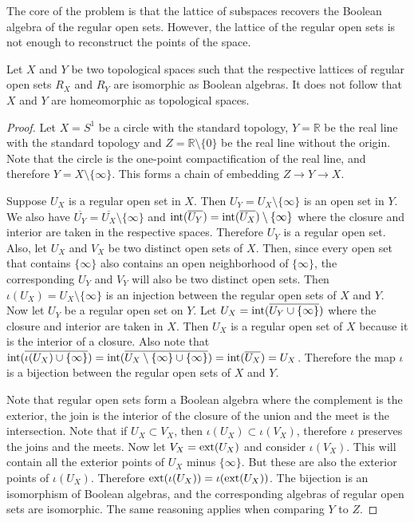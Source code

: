 The core of the problem is that the lattice of subspaces recovers the Boolean algebra of the regular open sets. However, the lattice of the regular open sets is not enough to reconstruct the points of the space.

\begin{prop}\label{pm-es-regularOpenSetsNotEnough}
	Let $X$ and $Y$ be two topological spaces such that the respective lattices of regular open sets $R_X$ and $R_Y$ are isomorphic as Boolean algebras. It does not follow that $X$ and $Y$ are homeomorphic as topological spaces.
\end{prop}

\begin{proof}
	Let $X=S^1$ be a circle with the standard topology, $Y=\mathbb{R}$ be the real line with the standard topology and $Z=\mathbb{R}\setminus \{0\}$ be the real line without the origin. Note that the circle is the one-point compactification of the real line, and therefore $Y=X\setminus \{\infty\}$. This forms a chain of embedding $Z \to Y \to X$.
	
	Suppose $U_X$ is a regular open set in $X$. Then $U_Y = U_X \setminus \{\infty\}$ is an open set in $Y$. We also have $\overline{U_Y} = \overline{U_X} \setminus \{\infty\}$ and $\operatorname{int}(\overline{U_Y}) = \operatorname{int}(\overline{U_X}) \setminus \{\infty\}$ where the closure and interior are taken in the respective spaces. Therefore $U_Y$ is a regular open set. Also, let $U_X$ and $V_X$ be two distinct open sets of $X$. Then, since every open set that contains $\{\infty\}$ also contains an open neighborhood of $\{\infty\}$, the corresponding $U_Y$ and $V_Y$ will also be two distinct open sets. Then $\iota(U_X) = U_X \setminus \{\infty\}$ is an injection between the regular open sets of $X$ and $Y$. Now let $U_Y$ be a regular open set on $Y$. Let $U_X = \operatorname{int}(\overline{U_Y \cup \{ \infty \}})$ where the  closure and interior are taken in $X$. Then $U_X$ is a regular open set of $X$ because it is the interior of a closure. Also note that $\operatorname{int}(\overline{\iota(U_X) \cup \{ \infty \}}) = \operatorname{int}(\overline{U_X \setminus \{\infty\} \cup \{ \infty \}}) = \operatorname{int}(\overline{U_X}) = U_X$. Therefore the map $\iota$ is a bijection between the regular open sets of $X$ and $Y$.
	
	Note that regular open sets form a Boolean algebra where the complement is the exterior, the join is the interior of the closure of the union and the meet is the intersection. Note that if $U_X \subset V_X$, then $\iota(U_X) \subset \iota(V_X)$, therefore $\iota$ preserves the joins and the meets. Now let $V_X = \operatorname{ext}(U_X)$ and consider $\iota(V_X)$. This will contain all the exterior points of $U_X$ minus $\{\infty\}$. But these are also the exterior points of $\iota(U_X)$. Therefore $\operatorname{ext}(\iota(U_X)) = \iota(\operatorname{ext}(U_X))$. The bijection is an isomorphism of Boolean algebras, and the corresponding algebras of regular open sets are isomorphic. The same reasoning applies when comparing $Y$ to $Z$.
	

\end{proof}
